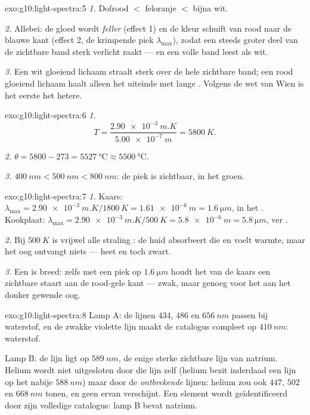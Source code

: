 \begin{solution}{exo:g10:light-spectra:5}
\emph{1.} Dofrood $<$ feloranje $<$ bijna wit.

\emph{2.} Allebei: de gloed wordt \emph{feller} (effect 1) en de kleur
schuift van rood naar de blauwe kant (effect 2, de krimpende piek
$\lambda_{\max}$), zodat een steeds groter deel van de zichtbare band
sterk verlicht raakt --- en een volle band leest als wit.

\emph{3.} Een wit gloeiend lichaam straalt sterk over de hele zichtbare
band; een rood gloeiend lichaam haalt alleen het uiteinde met lange
. Volgens de wet van Wien is het eerste het hetere.
\end{solution}

\begin{solution}{exo:g10:light-spectra:6}
\emph{1.}
\[
T = \frac{\qty{2.90e-3}{m.K}}{\qty{5.00e-7}{m}} = \qty{5800}{K}.
\]

\emph{2.} $\theta = 5800 - 273 = \qty{5527}{\degreeCelsius} \approx
\qty{5500}{\degreeCelsius}$.

\emph{3.} $\qty{400}{nm} < \qty{500}{nm} < \qty{800}{nm}$: de piek is
zichtbaar, in het groen.
\end{solution}

\begin{solution}{exo:g10:light-spectra:7}
\emph{1.} Kaars:
$\lambda_{\max} = \qty{2.90e-3}{m.K} / \qty{1800}{K} = \qty{1.61e-6}{m}
= \qty{1.6}{\micro m}$, in het . Kookplaat:
$\lambda_{\max} = \qty{2.90e-3}{m.K} / \qty{500}{K} = \qty{5.8e-6}{m}
= \qty{5.8}{\micro m}$, ver .

\emph{2.} Bij $\qty{500}{K}$ is vrijwel alle straling : de huid
absorbeert die en voelt warmte, maar het oog ontvangt niets --- heet en
toch zwart.

\emph{3.} Een  is breed: zelfs met een piek op
$\qty{1.6}{\micro m}$ houdt het  van de kaars een zichtbare
staart aan de rood-gele kant --- zwak, maar genoeg voor het aan het
donker gewende oog.
\end{solution}

\begin{solution}{exo:g10:light-spectra:8}
Lamp A: de lijnen $434$, $486$ en $\qty{656}{nm}$ passen bij waterstof,
en de zwakke violette lijn maakt de catalogus compleet op
$\qty{410}{nm}$: waterstof.

Lamp B: de lijn ligt op $\qty{589}{nm}$, de enige sterke zichtbare lijn
van natrium. Helium wordt niet uitgesloten door die lijn zelf (helium
bezit inderdaad een lijn op het nabije $\qty{588}{nm}$) maar door de
\emph{ontbrekende} lijnen: helium zou ook $447$, $502$ en
$\qty{668}{nm}$ tonen, en geen ervan verschijnt. Een element wordt
geïdentificeerd door zijn volledige catalogus: lamp B bevat natrium.
\end{solution}

